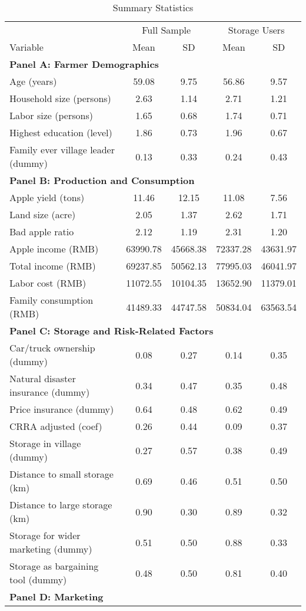 \begin{table}[htbp]
\centering
\caption{Summary Statistics}
\begin{tabular}{lcccc}
\hline
& \multicolumn{2}{c}{Full Sample} & \multicolumn{2}{c}{Storage Users} \\
\cline{2-3} \cline{4-5}
Variable & Mean & SD & Mean & SD \\
\hline
\multicolumn{5}{l}{\textbf{Panel A: Farmer Demographics}} \\

Age (years) & 59.08 & 9.75 & 56.86 & 9.57 \\ 
Household size (persons) & 2.63 & 1.14 & 2.71 & 1.21 \\ 
Labor size (persons) & 1.65 & 0.68 & 1.74 & 0.71 \\ 
Highest education (level) & 1.86 & 0.73 & 1.96 & 0.67 \\ 
Family ever village leader (dummy) & 0.13 & 0.33 & 0.24 & 0.43 \\ 
\hline
\multicolumn{5}{l}{\textbf{Panel B: Production and Consumption}} \\

Apple yield (tons) & 11.46 & 12.15 & 11.08 & 7.56 \\ 
Land size (acre) & 2.05 & 1.37 & 2.62 & 1.71 \\ 
Bad apple ratio & 2.12 & 1.19 & 2.31 & 1.20 \\ 
Apple income (RMB) & 63990.78 & 45668.38 & 72337.28 & 43631.97 \\ 
Total income (RMB) & 69237.85 & 50562.13 & 77995.03 & 46041.97 \\ 
Labor cost (RMB) & 11072.55 & 10104.35 & 13652.90 & 11379.01 \\ 
Family consumption (RMB) & 41489.33 & 44747.58 & 50834.04 & 63563.54 \\ 
\hline
\multicolumn{5}{l}{\textbf{Panel C: Storage and Risk-Related Factors}} \\

Car/truck ownership (dummy) & 0.08 & 0.27 & 0.14 & 0.35 \\ 
Natural disaster insurance (dummy) & 0.34 & 0.47 & 0.35 & 0.48 \\ 
Price insurance (dummy) & 0.64 & 0.48 & 0.62 & 0.49 \\ 
CRRA adjusted (coef) & 0.26 & 0.44 & 0.09 & 0.37 \\ 
Storage in village (dummy) & 0.27 & 0.57 & 0.38 & 0.49 \\ 
Distance to small storage (km) & 0.69 & 0.46 & 0.51 & 0.50 \\ 
Distance to large storage (km) & 0.90 & 0.30 & 0.89 & 0.32 \\ 
Storage for wider marketing (dummy) & 0.51 & 0.50 & 0.88 & 0.33 \\ 
Storage as bargaining tool (dummy) & 0.48 & 0.50 & 0.81 & 0.40 \\ 
\hline
\multicolumn{5}{l}{\textbf{Panel D: Marketing}} \\


\end{tabular}
\end{table}
